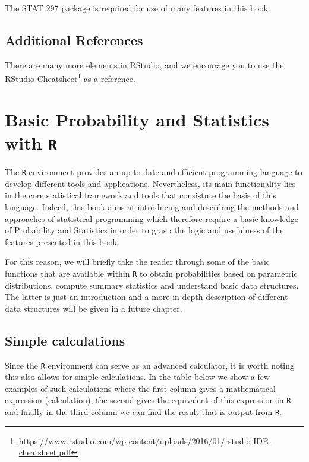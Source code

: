 \documentclass[12pt,]{krantz}
\renewcommand{\href}[2]{#2\footnote{\url{#1}}}
\let\BeginKnitrBlock\begin \let\EndKnitrBlock\end
\begin{document}
\BeginKnitrBlock{rmdwarning}
The STAT 297 package is required for use of many features in this book.
\EndKnitrBlock{rmdwarning}

\subsection{Additional References}\label{additional-references}

There are many more elements in RStudio, and we encourage you to use the
\href{https://www.rstudio.com/wp-content/uploads/2016/01/rstudio-IDE-cheatsheet.pdf}{RStudio
Cheatsheet} as a reference.

\section{\texorpdfstring{Basic Probability and Statistics with
\texttt{R}}{Basic Probability and Statistics with R}}\label{basic-probability-and-statistics-with-r}

The \texttt{R} environment provides an up-to-date and efficient
programming language to develop different tools and applications.
Nevertheless, its main functionality lies in the core statistical
framework and tools that consistute the basis of this language. Indeed,
this book aims at introducing and describing the methods and approaches
of statistical programming which therefore require a basic knowledge of
Probability and Statistics in order to grasp the logic and usefulness of
the features presented in this book.

For this reason, we will briefly take the reader through some of the
basic functions that are available within \texttt{R} to obtain
probabilities based on parametric distributions, compute summary
statistics and understand basic data structures. The latter is just an
introduction and a more in-depth description of different data
structures will be given in a future chapter.

\subsection{Simple calculations}\label{simple-calculations}

Since the \texttt{R} environment can serve as an advanced calculator, it
is worth noting this also allows for simple calculations. In the table
below we show a few examples of such calculations where the first column
gives a mathematical expression (calculation), the second gives the
equivalent of this expression in \texttt{R} and finally in the third
column we can find the result that is output from \texttt{R}.
\end{document}
